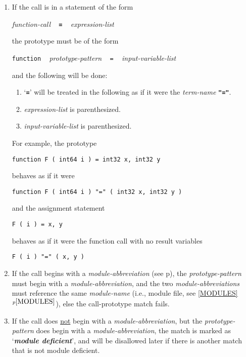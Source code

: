 \documentclass[12pt]{article}
\newcommand{\TT}[1]{{\tt \bfseries #1}}
\newcommand{\key}[1]{{\bf \em #1}\index{#1}}
\newcommand{\itemref}[1]{\ref{#1}$^{p\pageref{#1}}$}
\newcommand{\pagref}[1]{p\pageref{#1}}
\begin{document}
\begin{enumerate}

\item
If the call is in a statement of the form
\begin{center}
{\em function-call} ~ \TT{=} ~ {\em expression-list}
\end{center}
the prototype must be of the form
\begin{center}
{\tt function} ~ {\em prototype-pattern} ~ {\tt =} ~ {\em input-variable-list} \\
\end{center}
and the following will be done:
\begin{enumerate}
\item `\TT{=}' will be treated in the following as if it were the
{\em term-name} \TT{"="}.
\item{\em expression-list} is parenthesized.
\item {\em input-variable-list} is parenthesized.
\end{enumerate}

For example, the prototype
\begin{center}
\tt function F ( int64 i ) = int32 x, int32 y
\end{center}
behaves as if it were
\begin{center}
\tt function F ( int64 i ) "=" ( int32 x, int32 y )
\end{center}
and the assignment statement
\begin{center}
\tt F ( i ) = x, y
\end{center}
behaves as if it were the function call with no result variables
\begin{center}
\tt F ( i ) "=" ( x, y )
\end{center}

\item If the call begins with a {\em module-abbreviation}
(see \pagref{MODULE-ABBREVIATION}), the {\em prototype-pattern}
must begin with a {\em module-abbreviation}, and the two
{\em module-abbreviations} must reference the same {\em module-name}
(i.e., module file, see \itemref{MODULES}), else the
call-prototype match fails.

\item If the call does \underline{not} begin
with a {\em module-abbreviation}, but the {\em prototype-pattern}
does begin with a {\em module-abbreviation}, the match is marked
as `\key{module deficient}'\label{MODULE-DEFICIENT},
and will be disallowed later if there is
another match that is not module deficient.


\end{enumerate}
\end{document}
